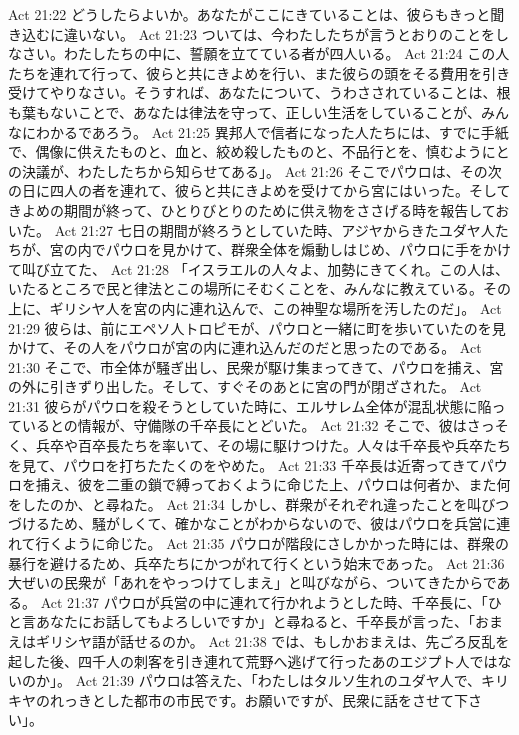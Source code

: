 Act 21:22  どうしたらよいか。あなたがここにきていることは、彼らもきっと聞き込むに違いない。
Act 21:23  ついては、今わたしたちが言うとおりのことをしなさい。わたしたちの中に、誓願を立てている者が四人いる。
Act 21:24  この人たちを連れて行って、彼らと共にきよめを行い、また彼らの頭をそる費用を引き受けてやりなさい。そうすれば、あなたについて、うわさされていることは、根も葉もないことで、あなたは律法を守って、正しい生活をしていることが、みんなにわかるであろう。
Act 21:25  異邦人で信者になった人たちには、すでに手紙で、偶像に供えたものと、血と、絞め殺したものと、不品行とを、慎むようにとの決議が、わたしたちから知らせてある」。
Act 21:26  そこでパウロは、その次の日に四人の者を連れて、彼らと共にきよめを受けてから宮にはいった。そしてきよめの期間が終って、ひとりびとりのために供え物をささげる時を報告しておいた。
Act 21:27  七日の期間が終ろうとしていた時、アジヤからきたユダヤ人たちが、宮の内でパウロを見かけて、群衆全体を煽動しはじめ、パウロに手をかけて叫び立てた、
Act 21:28  「イスラエルの人々よ、加勢にきてくれ。この人は、いたるところで民と律法とこの場所にそむくことを、みんなに教えている。その上に、ギリシヤ人を宮の内に連れ込んで、この神聖な場所を汚したのだ」。
Act 21:29  彼らは、前にエペソ人トロピモが、パウロと一緒に町を歩いていたのを見かけて、その人をパウロが宮の内に連れ込んだのだと思ったのである。
Act 21:30  そこで、市全体が騒ぎ出し、民衆が駆け集まってきて、パウロを捕え、宮の外に引きずり出した。そして、すぐそのあとに宮の門が閉ざされた。
Act 21:31  彼らがパウロを殺そうとしていた時に、エルサレム全体が混乱状態に陥っているとの情報が、守備隊の千卒長にとどいた。
Act 21:32  そこで、彼はさっそく、兵卒や百卒長たちを率いて、その場に駆けつけた。人々は千卒長や兵卒たちを見て、パウロを打ちたたくのをやめた。
Act 21:33  千卒長は近寄ってきてパウロを捕え、彼を二重の鎖で縛っておくように命じた上、パウロは何者か、また何をしたのか、と尋ねた。
Act 21:34  しかし、群衆がそれぞれ違ったことを叫びつづけるため、騒がしくて、確かなことがわからないので、彼はパウロを兵営に連れて行くように命じた。
Act 21:35  パウロが階段にさしかかった時には、群衆の暴行を避けるため、兵卒たちにかつがれて行くという始末であった。
Act 21:36  大ぜいの民衆が「あれをやっつけてしまえ」と叫びながら、ついてきたからである。
Act 21:37  パウロが兵営の中に連れて行かれようとした時、千卒長に、「ひと言あなたにお話してもよろしいですか」と尋ねると、千卒長が言った、「おまえはギリシヤ語が話せるのか。
Act 21:38  では、もしかおまえは、先ごろ反乱を起した後、四千人の刺客を引き連れて荒野へ逃げて行ったあのエジプト人ではないのか」。
Act 21:39  パウロは答えた、「わたしはタルソ生れのユダヤ人で、キリキヤのれっきとした都市の市民です。お願いですが、民衆に話をさせて下さい」。

